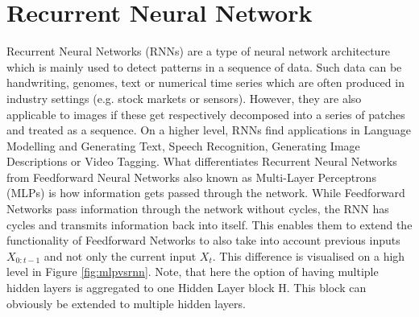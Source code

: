 \section{Recurrent Neural Network}
Recurrent Neural Networks (RNNs) are a type of neural network architecture which is mainly used
to detect patterns in a sequence of data\cite{rnn}. Such data can be handwriting, genomes, text or numerical
time series which are often produced in industry settings (e.g. stock markets or sensors).
However, they are also applicable to images if these get respectively decomposed into a series of
patches and treated as a sequence\cite{rnn}. On a higher level, RNNs find applications in Language
Modelling and Generating Text, Speech Recognition, Generating Image Descriptions or Video Tagging.
What differentiates Recurrent Neural Networks from Feedforward Neural Networks also known
as Multi-Layer Perceptrons (MLPs) is how information gets passed through the network\cite{rnn}. While
Feedforward Networks pass information through the network without cycles, the RNN has cycles and
transmits information back into itself\cite{rnn}. This enables them to extend the functionality of Feedforward
Networks to also take into account previous inputs $X_{0:t-1}$ and not only the current input $X_t$. This
difference is visualised on a high level in Figure \ref{fig:mlpvsrnn}. Note, that here the option of having multiple
hidden layers is aggregated to one Hidden Layer block H. This block can obviously be extended to
multiple hidden layers.

